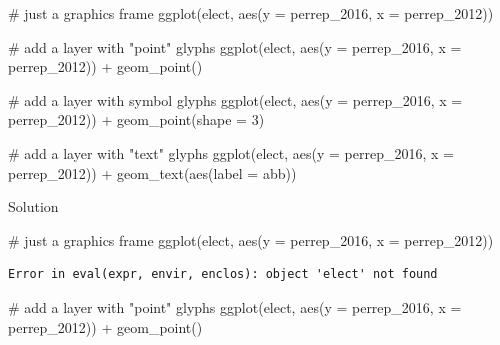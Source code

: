 \documentclass[
  letterpaper,
  DIV=11,
  numbers=noendperiod]{scrreprt}
\newenvironment{Shaded}{\begin{snugshade}}{\end{snugshade}}
\newcommand{\AttributeTok}[1]{\textcolor[rgb]{0.40,0.45,0.13}{#1}}
\newcommand{\CommentTok}[1]{\textcolor[rgb]{0.37,0.37,0.37}{#1}}
\newcommand{\DecValTok}[1]{\textcolor[rgb]{0.68,0.00,0.00}{#1}}
\newcommand{\FunctionTok}[1]{\textcolor[rgb]{0.28,0.35,0.67}{#1}}
\newcommand{\NormalTok}[1]{\textcolor[rgb]{0.00,0.23,0.31}{#1}}
\newcommand{\SpecialCharTok}[1]{\textcolor[rgb]{0.37,0.37,0.37}{#1}}
\begin{document}
\begin{Shaded}
\begin{Highlighting}[]
\CommentTok{\# just a graphics frame}
\FunctionTok{ggplot}\NormalTok{(elect, }\FunctionTok{aes}\NormalTok{(}\AttributeTok{y =}\NormalTok{ perrep\_2016, }\AttributeTok{x =}\NormalTok{ perrep\_2012))}

\CommentTok{\# add a layer with "point" glyphs}
\FunctionTok{ggplot}\NormalTok{(elect, }\FunctionTok{aes}\NormalTok{(}\AttributeTok{y =}\NormalTok{ perrep\_2016, }\AttributeTok{x =}\NormalTok{ perrep\_2012)) }\SpecialCharTok{+}
  \FunctionTok{geom\_point}\NormalTok{()}

\CommentTok{\# add a layer with symbol glyphs}
\FunctionTok{ggplot}\NormalTok{(elect, }\FunctionTok{aes}\NormalTok{(}\AttributeTok{y =}\NormalTok{ perrep\_2016, }\AttributeTok{x =}\NormalTok{ perrep\_2012)) }\SpecialCharTok{+}
  \FunctionTok{geom\_point}\NormalTok{(}\AttributeTok{shape =} \DecValTok{3}\NormalTok{)}

\CommentTok{\# add a layer with "text" glyphs}
\FunctionTok{ggplot}\NormalTok{(elect, }\FunctionTok{aes}\NormalTok{(}\AttributeTok{y =}\NormalTok{ perrep\_2016, }\AttributeTok{x =}\NormalTok{ perrep\_2012)) }\SpecialCharTok{+}
  \FunctionTok{geom\_text}\NormalTok{(}\FunctionTok{aes}\NormalTok{(}\AttributeTok{label =}\NormalTok{ abb))}
\end{Highlighting}
\end{Shaded}

Solution

\begin{Shaded}
\begin{Highlighting}[]
\CommentTok{\# just a graphics frame}
\FunctionTok{ggplot}\NormalTok{(elect, }\FunctionTok{aes}\NormalTok{(}\AttributeTok{y =}\NormalTok{ perrep\_2016, }\AttributeTok{x =}\NormalTok{ perrep\_2012))}
\end{Highlighting}
\end{Shaded}

\begin{verbatim}
Error in eval(expr, envir, enclos): object 'elect' not found
\end{verbatim}

\begin{Shaded}
\begin{Highlighting}[]
\CommentTok{\# add a layer with "point" glyphs}
\FunctionTok{ggplot}\NormalTok{(elect, }\FunctionTok{aes}\NormalTok{(}\AttributeTok{y =}\NormalTok{ perrep\_2016, }\AttributeTok{x =}\NormalTok{ perrep\_2012)) }\SpecialCharTok{+}
  \FunctionTok{geom\_point}\NormalTok{()}
\end{Highlighting}
\end{Shaded}
\end{document}
